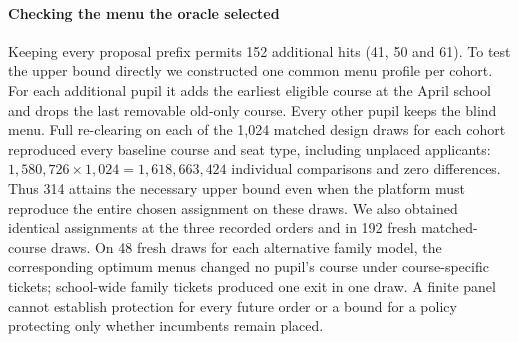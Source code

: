\paragraph{Checking the menu the oracle selected}
Keeping every proposal prefix permits 152 additional hits (41, 50 and 61). To test the upper bound directly we constructed one common menu profile per cohort. For each additional pupil it adds the earliest eligible course at the April school and drops the last removable old-only course. Every other pupil keeps the blind menu. Full re-clearing on each of the 1,024 matched design draws for each cohort reproduced every baseline course and seat type, including unplaced applicants: $1{,}580{,}726\times 1{,}024=1{,}618{,}663{,}424$ individual comparisons and zero differences. Thus 314 attains the necessary upper bound even when the platform must reproduce the entire chosen assignment on these draws. We also obtained identical assignments at the three recorded orders and in 192 fresh matched-course draws. On 48 fresh draws for each alternative family model, the corresponding optimum menus changed no pupil's course under course-specific tickets; school-wide family tickets produced one exit in one draw. A finite panel cannot establish protection for every future order or a bound for a policy protecting only whether incumbents remain placed.
